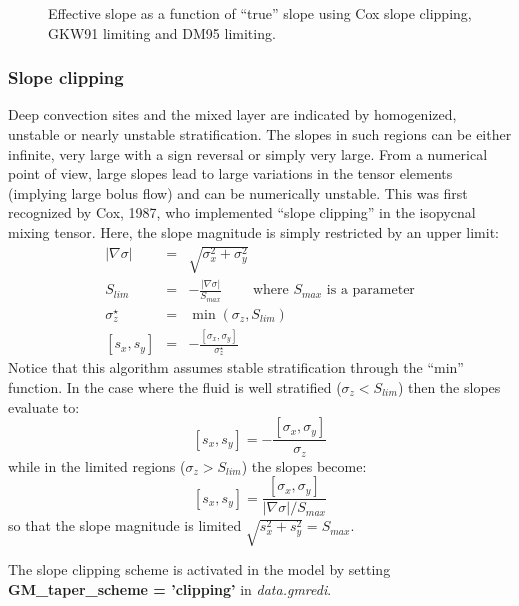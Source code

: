 \begin{figure}
\begin{center}
\end{center}
\caption{Effective slope as a function of ``true'' slope using Cox
slope clipping, GKW91 limiting and DM95 limiting.}
\label{fig:effective_slopes}
\end{figure}


\subsubsection{Slope clipping}

Deep convection sites and the mixed layer are indicated by
homogenized, unstable or nearly unstable stratification. The slopes in
such regions can be either infinite, very large with a sign reversal
or simply very large. From a numerical point of view, large slopes
lead to large variations in the tensor elements (implying large bolus
flow) and can be numerically unstable. This was first recognized by
Cox, 1987, who implemented ``slope clipping'' in the isopycnal mixing
tensor. Here, the slope magnitude is simply restricted by an upper
limit:
\begin{eqnarray}
|\nabla \sigma| & = & \sqrt{ \sigma_x^2 + \sigma_y^2 } \\
S_{lim} & = & - \frac{|\nabla \sigma|}{ S_{max} }
\;\;\;\;\;\;\;\; \mbox{where $S_{max}$ is a parameter} \\
\sigma_z^\star & = & \min( \sigma_z , S_{lim} ) \\
{[s_x,s_y]} & = & - \frac{ [\sigma_x,\sigma_y] }{\sigma_z^\star}
\end{eqnarray}
Notice that this algorithm assumes stable stratification through the
``min'' function. In the case where the fluid is well stratified ($\sigma_z < S_{lim}$) then the slopes evaluate to:
\begin{equation}
{[s_x,s_y]} = - \frac{ [\sigma_x,\sigma_y] }{\sigma_z}
\end{equation}
while in the limited regions ($\sigma_z > S_{lim}$) the slopes become:
\begin{equation}
{[s_x,s_y]} = \frac{ [\sigma_x,\sigma_y] }{|\nabla \sigma|/S_{max}}
\end{equation}
so that the slope magnitude is limited $\sqrt{s_x^2 + s_y^2} =
S_{max}$.

The slope clipping scheme is activated in the model by setting {\bf
GM\_tap\-er\_scheme = 'clipping'} in {\em data.gmredi}.

